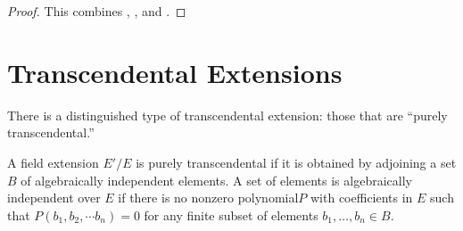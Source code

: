 \begin{proof} This combines , , and .
\end{proof}


\section{Transcendental Extensions}


There is a distinguished type of transcendental extension: those that are
``purely transcendental.'' 
\begin{definition} A field extension $E'/E$ is purely transcendental if it is
obtained by adjoining a set $B$ of algebraically independent elements. A set of
elements is algebraically independent over $E$ if there is no nonzero polynomial$P$
with coefficients in $E$ such
that $P(b_1,b_2,\cdots b_n)=0$ for any finite subset of elements $b_1, \dots,
b_n \in B$.
\end{definition}

